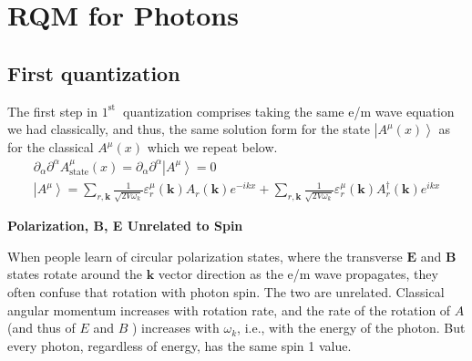 \section{RQM for Photons}
\subsection{First quantization}
The first step in $1^{\text {st }}$ quantization comprises taking the same e/m wave equation we had classically, and thus, the same solution form for the state $\left|A^{\mu}(x)\right\rangle$ as for the classical $A^{\mu}(x)$  which we repeat below.
\begin{equation}
\begin{array}{c}
{\partial_{\alpha} \partial^{\alpha} A_{\text {state}}^{\mu}(x)=\partial_{\alpha} \partial^{\alpha}\left|A^{\mu}\right\rangle= 0} \\
{\left|A^{\mu}\right\rangle=\sum_{r, \mathbf{k}} \frac{1}{\sqrt{2 V \omega_{k}}} \varepsilon_{r}^{\mu}(\mathbf{k}) A_{r}(\mathbf{k}) e^{-i k x}+\sum_{r, \mathbf{k}} \frac{1}{\sqrt{2 V \omega_{k}}} \varepsilon_{r}^{\mu}(\mathbf{k}) A_{r}^{\dagger}(\mathbf{k}) e^{i k x}}
\end{array}
\end{equation}
\begin{mybox}
\begin{center}
    \textbf{Polarization, B, E Unrelated to Spin}
\end{center}
When people learn of circular polarization states, where the transverse $\mathbf{E}$ and $\mathbf{B}$ states rotate around the $\mathbf{k}$ vector direction as the e/m wave propagates, they often confuse that rotation with photon spin. The two are unrelated. Classical angular momentum increases with rotation rate, and the rate of the rotation of $A$ (and thus of $E$ and $B$ ) increases with $\omega_k$, i.e., with the energy of the photon. But every photon, regardless of energy, has the same spin 1 value.
\end{mybox}

